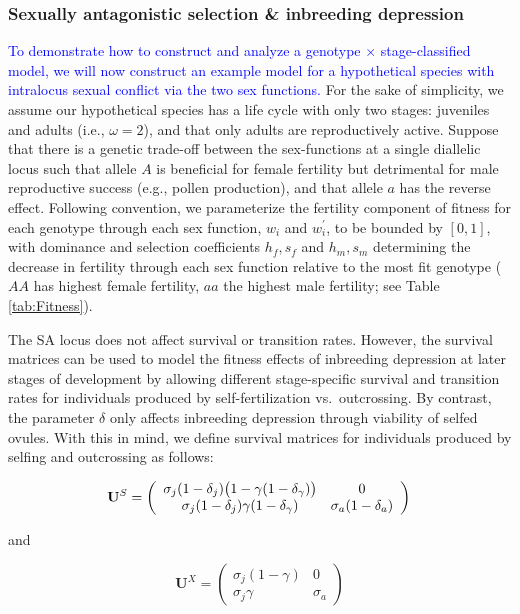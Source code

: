 \documentclass[11pt]{article}
\def\mbf#1{\mathbf{#1}}
\begin{document}
\subsubsection*{Sexually antagonistic selection \& inbreeding depression} \label{sec:SAsel}

\textcolor{blue}{To demonstrate how to construct and analyze a genotype $\times$ stage-classified model, we will now construct an example model for a hypothetical species with intralocus sexual conflict via the two sex functions. }For the sake of simplicity, we assume our hypothetical species has a life cycle with only two stages: juveniles and adults (i.e., $\omega = 2$), and that only adults are reproductively active. Suppose that there is a genetic trade-off between the sex-functions at a single diallelic locus such that allele $A$ is beneficial for female fertility but detrimental for male reproductive success (e.g., pollen production), and that allele $a$ has the reverse effect. Following convention, we parameterize the fertility component of fitness for each genotype through each sex function, $w_{i}$ and $w^{\prime}_{i}$, to be bounded by $[0,1]$, with dominance and selection coefficients $h_f, s_f$ and $h_m, s_m$ determining the decrease in fertility through each sex function relative to the most fit genotype ($AA$ has highest female fertility, $aa$ the highest male fertility; see Table \ref{tab:Fitness}). 

The SA locus does not affect survival or transition rates. However, the survival matrices can be used to model the fitness effects of inbreeding depression at later stages of development by allowing different stage-specific survival and transition rates for individuals produced by self-fertilization vs.~outcrossing. By contrast, the parameter $\delta$ only affects inbreeding depression through viability of selfed ovules. With this in mind, we define survival matrices for individuals produced by selfing and outcrossing as follows:
\begin{linenomath*}
\begin{equation} \label{eq:US}
	\mbf{U}^S = \left(
					\begin{array}{cc}
						\sigma_j (1 - \delta_j) \big(1 - \gamma (1 - \delta_{\gamma}) \big) & 0 \\
						\sigma_j (1 - \delta_j) \gamma (1 - \delta_{\gamma})      & \sigma_a (1 - \delta_a)
					\end{array}
				\right) \\
\end{equation}
\end{linenomath*}
\noindent and 
\begin{linenomath*}
\begin{equation}\label{eq:UX}
	\mbf{U}^X = \left(
					\begin{array}{cc}
						\sigma_j(1 - \gamma) & 0 \\
						\sigma_j \gamma      & \sigma_a
					\end{array}
				\right)
\end{equation}
\end{linenomath*}
\end{document}

